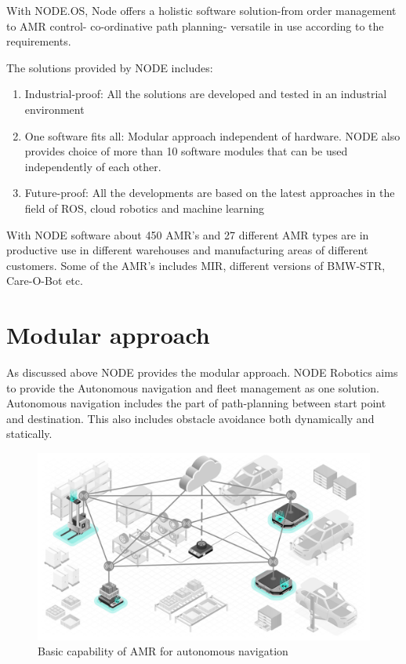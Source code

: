  With NODE.OS, Node offers a holistic software solution-from order management to AMR control- co-ordinative path planning- versatile in use according to the requirements. 
 
 The solutions provided by NODE includes: 
 \begin{enumerate}
 	\item Industrial-proof: All the solutions are developed and tested in an industrial environment
 	\item One software fits all: Modular approach independent of hardware. NODE also provides choice of more than 10 software modules that can be used independently of each other.
 	\item Future-proof: All the developments are based on the latest approaches in the field of ROS, cloud robotics and machine learning
 \end{enumerate}
 
 With NODE software about 450 AMR's and 27 different AMR types are in productive use in different warehouses and manufacturing areas of different customers. Some of the AMR's includes MIR, different versions of BMW-STR, Care-O-Bot etc.      
 
 

\section{Modular approach}
As discussed above NODE provides the modular approach. NODE Robotics aims to provide the Autonomous navigation and fleet management as one solution. Autonomous navigation includes the part of path-planning between start point and destination. This also includes obstacle avoidance both dynamically and statically. 
\begin{figure}[h]
	\begin{center}
		\includegraphics[height=9 cm]{images/structure.jpg}
		\caption{Basic capability of AMR for autonomous navigation}
	\end{center}
\end{figure}

